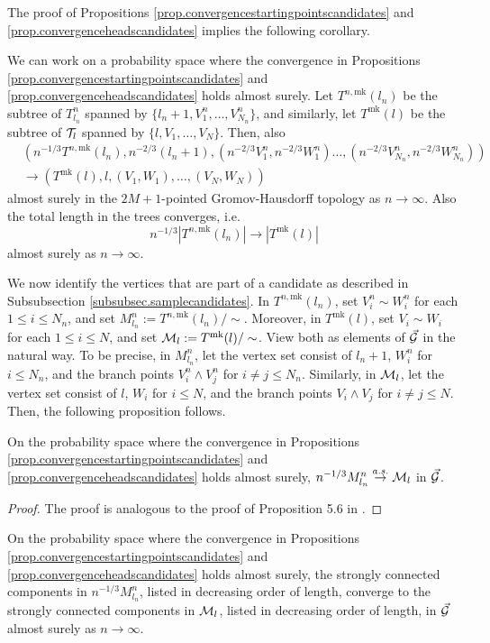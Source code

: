 The proof of Propositions \ref{prop.convergencestartingpointscandidates} and \ref{prop.convergenceheadscandidates} implies the following corollary.
\begin{corollary}
We can work on a probability space where the convergence in Propositions \ref{prop.convergencestartingpointscandidates} and \ref{prop.convergenceheadscandidates} holds almost surely. Let $T^{n,\text{mk}}(l_n)$ be the subtree of $T^n_{l_n}$ spanned by $\{l_n+1,V^n_1,\dots,V^n_{N_n}\}$, and similarly, let $T^{\text{mk}}(l)$ be the subtree of ${\mathcal T}_l$ spanned by $\{l,V_1,\dots,V_N\}$. Then, also 
\begin{align*}&\left(n^{-1/3}T^{n,\text{mk}}(l_n), n^{-2/3}(l_n+1), \left(n^{-2/3}V^n_1,n^{-2/3}W^n_1\right) \dots, \left(n^{-2/3}V^n_{N_n}, n^{-2/3}W^n_{N_n}\right)\right)\\
&\to \left(T^{\text{mk}}(l), l, (V_1,W_1),\dots, (V_{N},W_{N})\right)\end{align*}
almost surely in the $2M+1$-pointed Gromov-Hausdorff topology as $n\to \infty$. Also the total length in the trees converges, i.e.
$$n^{-1/3}\left|T^{n,\text{mk}}(l_n)\right|\to \left| T^{\text{mk}}(l)\right|$$
almost surely as $n\to\infty$.
\end{corollary}
We now identify the vertices that are part of a candidate as described in Subsubsection \ref{subsubsec.samplecandidates}. In $T^{n,\text{mk}}(l_n)$, set $V_i^n\sim W_i^n$ for each $1\leq i\leq N_n$, and set $M^n_{l_n}:=T^{n,\text{mk}}(l_n)/\sim$. Moreover, in $T^{\text{mk}}(l)$, set $V_i\sim W_i$ for each $1\leq i\leq N$, and set ${\mathcal M}_l:=T^{\text{mk}}(l)/\sim$. View both as elements of $\vec{{\mathcal G}}$ in the natural way. To be precise, in  $M^n_{l_n}$, let the vertex set consist of $l_n+1$, $W_i^n$ for $i\leq N_n$, and the branch points $V_i^n\wedge V_j^n$ for $i\neq j\leq N_n$. Similarly, in ${\mathcal M}_l$, let the vertex set consist of $l$, $W_i$ for $i\leq N$, and the branch points $V_i\wedge V_j$ for $i\neq j\leq N$. Then, the following proposition follows.
\begin{proposition}
On the probability space where the convergence in Propositions \ref{prop.convergencestartingpointscandidates} and \ref{prop.convergenceheadscandidates} holds almost surely, 
$n^{-1/3}M^n_{l_n}\overset{a.s.}{\to} {\mathcal M}_l$
in $\vec{{\mathcal G}}$.
\end{proposition}
\begin{proof}
The proof is analogous to the proof of Proposition 5.6 in \cite{Goldschmidt2019}.
\end{proof}
\begin{corollary}\label{cor.sccsinonetreeconverge}
On the probability space where the convergence in Propositions \ref{prop.convergencestartingpointscandidates} and \ref{prop.convergenceheadscandidates} holds almost surely, the strongly connected components in $n^{-1/3}M^n_{l_n}$, listed in decreasing order of length, converge to the strongly connected components in ${\mathcal M}_l$, listed in decreasing order of length, in $\vec{{\mathcal G}}$ almost surely as $n\to \infty$.
\end{corollary}

